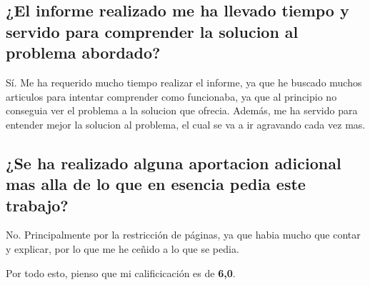 \documentclass[runningheads]{llncs}
\begin{document}
\subsection{¿El informe realizado me ha llevado tiempo y servido para comprender la solucion al problema abordado?}
Sí. Me ha requerido mucho tiempo realizar el informe, ya que he buscado muchos articulos para intentar comprender como funcionaba, ya que al principio no conseguia ver el problema a la solucion que ofrecia. Además, me ha servido para entender mejor la solucion al problema, el cual se va a ir agravando cada vez mas.

\subsection{¿Se ha realizado alguna aportacion adicional mas alla de lo que en esencia pedia este trabajo?}
No. Principalmente por la restricción de páginas, ya que habia mucho que contar y explicar, por lo que me he ceñido a lo que se pedia.

\bigskip

Por todo esto, pienso que mi calificicación es de \textbf{6,0}.
\end{document}
